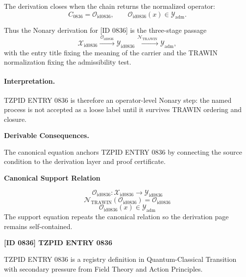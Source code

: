 The derivation closes when the chain returns the normalized operator:\[
C_{0836}=\mathcal{O}_{\mathrm{id0836}},\qquad \mathcal{O}_{\mathrm{id0836}}(x)\in\mathcal{Y}_{\mathrm{adm}}.
\]

Thus the Nonary derivation for [ID 0836] is the three-stage passage
\[
\mathcal{X}_{\mathrm{id0836}}\xrightarrow{\,\mathcal{O}_{\mathrm{id0836}}\,} \mathcal{Y}_{\mathrm{id0836}}\xrightarrow{\,\mathcal{N}_{\mathrm{TRAWIN}}\,} \mathcal{Y}_{\mathrm{adm}},
\]
with the entry title fixing the meaning of the carrier and the TRAWIN normalization fixing the admissibility test.

\paragraph{Interpretation.} TZPID ENTRY 0836 is therefore an operator-level Nonary step: the named process is not accepted as a loose label until it survives TRAWIN ordering and closure.

\par\vspace{0.35em}
\noindent\textbf{Derivable Consequences.}\quad
\begingroup
\footnotesize
\raggedright
The canonical equation anchors TZPID ENTRY 0836 by connecting the source condition to the derivation layer and proof certificate.
\par\endgroup

\noindent\textbf{Canonical Support Relation}\par
\[
\mathcal{O}_{\mathrm{id0836}}:\mathcal{X}_{\mathrm{id0836}}\longrightarrow\mathcal{Y}_{\mathrm{id0836}}
\]
\[
\mathcal{N}_{\mathrm{TRAWIN}}(\mathcal{O}_{\mathrm{id0836}})=\mathcal{O}_{\mathrm{id0836}}
\]
\[
\mathcal{O}_{\mathrm{id0836}}(x)\in\mathcal{Y}_{\mathrm{adm}}
\]
\noindent The support equation repeats the canonical relation so the derivation page remains self-contained.\par

\clearpage
\noindent\textbf{[ID 0836] TZPID ENTRY 0836}\par
\vspace{0.35em}
\begingroup\small
{}
TZPID ENTRY 0836 is a registry definition in Quantum-Classical Transition with secondary pressure from Field Theory and Action Principles.

